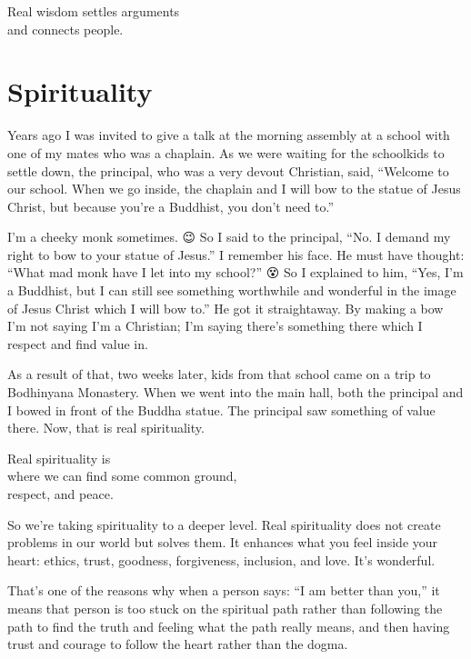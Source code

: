 \documentclass[12pt, openany]{book}
\newenvironment{aphorism}%
{%
\begin{center}\begin{itshape}
}%
{\end{itshape}\end{center}
}%
\begin{document}
\begin{aphorism}
Real wisdom settles arguments\\  
and connects people.
\end{aphorism}

\section*{Spirituality}

Years ago I was invited to give a talk at the morning assembly at a school with one of my mates who was a chaplain. As we were waiting for the schoolkids to settle down, the principal, who was a very devout Christian, said, “Welcome to our school. When we go inside, the chaplain and I will bow to the statue of Jesus Christ, but because you’re a Buddhist, you don’t need to.” 

I’m a cheeky monk sometimes. 😉 So I said to the principal, “No. I demand my right to bow to your statue of Jesus.” I remember his face. He must have thought: “What mad monk have I let into my school?” 😵 So I explained to him, “Yes, I’m a Buddhist, but I can still see something worthwhile and wonderful in the image of Jesus Christ which I will bow to.” He got it straightaway. By making a bow I’m not saying I’m a Christian; I’m saying there’s something there which I respect and find value in. 

As a result of that, two weeks later, kids from that school came on a trip to Bodhinyana Monastery. When we went into the main hall, both the principal and I bowed in front of the Buddha statue. The principal saw something of value there. Now, that is real spirituality. 

\begin{aphorism}
Real spirituality is\\  
where we can find some common ground,\\ 
respect, and peace.
\end{aphorism}

So we’re taking spirituality to a deeper level. Real spirituality does not create problems in our world but solves them. It enhances what you feel inside your heart: ethics, trust, goodness, forgiveness, inclusion, and love. It’s wonderful. 

That’s one of the reasons why when a person says: “I am better than you,” it means that person is too stuck on the spiritual path rather than following the path to find the truth and feeling what the path really means, and then having trust and courage to follow the heart rather than the dogma. 
\end{document}
